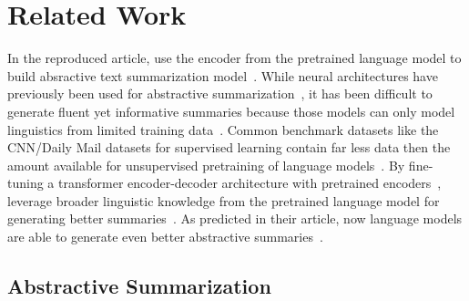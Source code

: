\section{Related Work} %

In the reproduced article, \citeauthor{LiuL2019} use the encoder from the pretrained \Bert language model to build absractive text summarization model~\cite{LiuL2019,DevlinCLT2019}.
While neural architectures have previously been used for abstractive summarization~\cite{NallapatiZSGX2016,SeeLM2017,PaulusXS2018}, it has been difficult to generate fluent yet informative summaries because those models can only model linguistics from limited training data~\todocite. Common benchmark datasets like the CNN/Daily Mail datasets for supervised learning contain far less data then the amount available for unsupervised pretraining of language models~\cite{HermannKGEKSB2015,DevlinCLT2019}.
By fine-tuning a transformer encoder-decoder architecture with pretrained encoders~\cite{VaswaniSPUJGKP2017,DevlinCLT2019}, \citeauthor{LiuL2019} leverage broader linguistic knowledge from the pretrained language model for generating better summaries~\cite{LiuL2019}.
As predicted in their article, now  language models are able to generate even better abstractive summaries~\todocite\cite{LiuL2019}.

\subsection{Abstractive Summarization}

